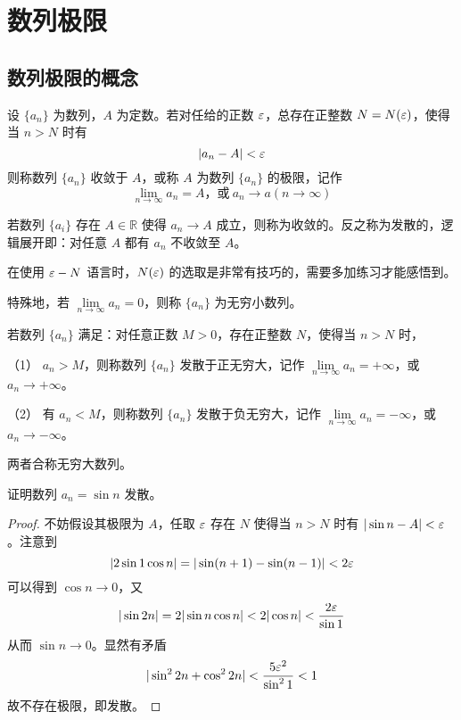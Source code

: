 \chapter{数列极限}

\section{数列极限的概念}

\begin{definition}
	设 $\{a_n\}$ 为数列，$A$ 为定数。若对任给的正数 $\varepsilon$，总存在正整数 $N=N(\varepsilon)$，使得当 $n>N$ 时有
	\[|a_n - A| < \varepsilon\]
	则称数列 $\{a_n\}$ 收敛于 $A$，或称 $A$ 为数列 $\{a_n\}$ 的极限，记作
	\[\lim\limits_{n\to \infty} a_n = A \text{，或}\ a_n \to a(n \to \infty)\]
\end{definition}

若数列 $\{a_i\}$ 存在 $A \in \mathbb{R}$ 使得 $a_n \to A$ 成立，则称为收敛的。反之称为发散的，逻辑展开即：对任意 $A$ 都有 $a_n$ 不收敛至 $A$。

在使用 $\varepsilon - N$ 语言时，$N(\varepsilon)$ 的选取是非常有技巧的，需要多加练习才能感悟到。

特殊地，若 $\lim\limits_{n\to \infty} a_n = 0$，则称 $\{a_n\}$ 为无穷小数列。

\begin{definition}[无穷大数列]
	若数列 $\{a_n\}$ 满足：对任意正数 $M>0$，存在正整数 $N$，使得当 $n>N$ 时，

	（1） $a_n>M$，则称数列 $\{a_n\}$ 发散于正无穷大，记作 $\lim\limits_{n\to \infty} a_n = +\infty$，或 $a_n \to +\infty$。

	（2） 有 $a_n<M$，则称数列 $\{a_n\}$ 发散于负无穷大，记作 $\lim\limits_{n\to \infty} a_n = -\infty$，或 $a_n \to -\infty$。

	两者合称无穷大数列。
\end{definition}

\begin{example}
	证明数列 $a_n = \sin n$ 发散。
\end{example}

\begin{proof}
	不妨假设其极限为 $A$，任取 $\varepsilon$ 存在 $N$ 使得当 $n > N$ 时有 $|\sin n - A| < \varepsilon$。注意到
	\[ |2 \sin 1 \cos n| = |\sin(n+1) - \sin(n-1)| < 2 \varepsilon \]
	可以得到 $\cos n \to 0$，又
	\[ |\sin 2n| = 2 |\sin n \cos n| < 2 |\cos n| < \frac{2\varepsilon}{\sin 1} \]
	从而 $\sin n \to 0$。显然有矛盾
	\[ |\sin^2 2n + \cos^2 2n| < \frac{5 \varepsilon^2}{\sin^2 1} < 1 \]
	故不存在极限，即发散。
\end{proof}

